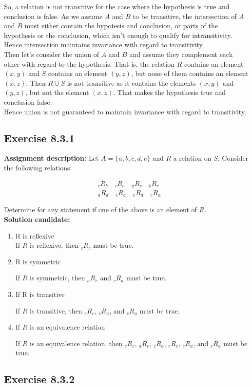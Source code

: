 \documentclass{report}
\newcommand{\mAlign}[1]{\begin{align*}#1\end{align*}}
\newcommand{\AssignmentDescription}{\textbf{Assignment description: }}
\newcommand{\Solution}{\textbf{Solution candidate: }}
\newcommand{\Exercise}[1]{\subsection{Exercise #1}}
\newcommand{\defaultEnumerateLabel}{\textbf{\alph*.}}
\begin{document}
	So, a relation is not transitive for the case where the hypothesis is true and conclusion is false. As we assume $A$ and $B$ to be transitive, the intersection of $A$ and $B$ must either contain the hypotesis and conclusion, or parts of the hypothesis or the conclusion, which isn't enough to qualify for intransitivity.\\
	
	Hence intersection maintains invariance with regard to transitivity.\\
	
	Then let's consider the union of $A$ and $B$ and assume they complement each other with regard to the hypothesis. That is, the relation $R$ contains an element $(x,y)$ and $S$ contains an element $(y,z)$, but none of them contains an element $(x,z)$. Then $R \cup S$ is not transitive as it contains the elements $(x,y)$ and $(y,z)$, but not the element $(x,z)$. That makes the hypothesis true and conclusion false.\\
	
	Hence union is not guaranteed to maintain invariance with regard to transitivity.
	
	\Exercise{8.3.1}
	
	\AssignmentDescription
	Let $A=\{a,b,c,d,e\}$ and $R$ a relation on $S$. Consider the following relations:
	
	\mAlign{&_cR_b \quad  _cR_c \quad _aR_c \quad  _bR_c \\
					&_aR_d \quad  _cR_a \quad _e R_d  \quad _cR_a } 
	
	Determine for any statement if one of the above is an element of $R$.\\
	
	\Solution
	
	\begin{enumerate}[label=\defaultEnumerateLabel]
		\item R is reflexive\\
		
		If $R$ is reflexive, then $_cR_c$ must be true.
		
		\item R is symmetric
		
		If $R$ is symmetric, then $_aR_c$ and $_cR_a$ must be true.
		
		\item If R is transitive
		
		If $R$ is transitive, then $_cR_c$, $_cR_a$, and $_cR_a$ must be true.
		
		\item If $R$ is an equivalence relation
		
		If $R$ is an equivalence relation, then $_cR_c$, $_aR_c$, $_cR_a$, $_cR_c$, $_cR_a$, and $_cR_a$ must be true.
	\end{enumerate}
	\Exercise{8.3.2}
	
\end{document}
